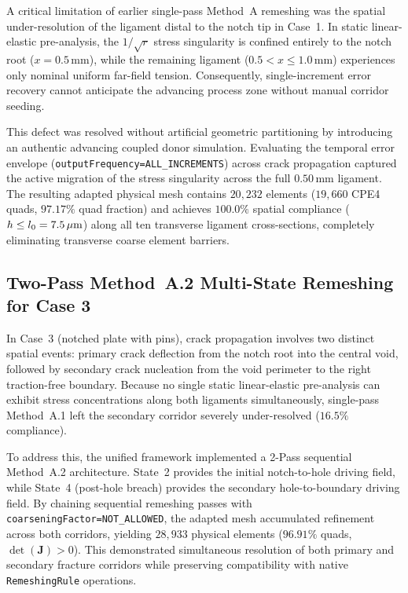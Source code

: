 A critical limitation of earlier single-pass Method~A remeshing was the spatial under-resolution of the ligament distal to the notch tip in Case~1. In static linear-elastic pre-analysis, the $1/\sqrt{r}$ stress singularity is confined entirely to the notch root ($x = 0.5\,\mathrm{mm}$), while the remaining ligament ($0.5 < x \le 1.0\,\mathrm{mm}$) experiences only nominal uniform far-field tension. Consequently, single-increment error recovery cannot anticipate the advancing process zone without manual corridor seeding.

This defect was resolved without artificial geometric partitioning by introducing an authentic advancing coupled donor simulation. Evaluating the temporal error envelope (\texttt{outputFrequency=ALL\_INCREMENTS}) across crack propagation captured the active migration of the stress singularity across the full $0.50\,\mathrm{mm}$ ligament. The resulting adapted physical mesh contains $20{,}232$ elements ($19{,}660$ CPE4 quads, $97.17\%$ quad fraction) and achieves $\mathbf{100.0\%}$ spatial compliance ($h \le l_0 = 7.5\,\mu\mathrm{m}$) along all ten transverse ligament cross-sections, completely eliminating transverse coarse element barriers.

\subsection{Two-Pass Method~A.2 Multi-State Remeshing for Case 3}
\label{subsec:case3_multistate_remeshing}

In Case~3 (notched plate with pins), crack propagation involves two distinct spatial events: primary crack deflection from the notch root into the central void, followed by secondary crack nucleation from the void perimeter to the right traction-free boundary. Because no single static linear-elastic pre-analysis can exhibit stress concentrations along both ligaments simultaneously, single-pass Method~A.1 left the secondary corridor severely under-resolved ($16.5\%$ compliance).

To address this, the unified framework implemented a 2-Pass sequential Method~A.2 architecture. State~2 provides the initial notch-to-hole driving field, while State~4 (post-hole breach) provides the secondary hole-to-boundary driving field. By chaining sequential remeshing passes with \texttt{coarseningFactor=NOT\_ALLOWED}, the adapted mesh accumulated refinement across both corridors, yielding $28{,}933$ physical elements ($96.91\%$ quads, $\det(\mathbf{J}) > 0$). This demonstrated simultaneous resolution of both primary and secondary fracture corridors while preserving compatibility with native \Abaqus \texttt{RemeshingRule} operations.

